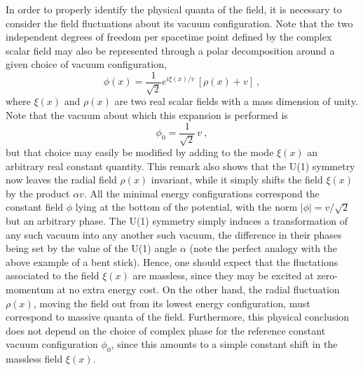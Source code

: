\documentclass[a4paper,11pt]{article}
\begin{document}
In order to properly identify the physical quanta of the field, it is
necessary to consider the field fluctuations about its vacuum configuration.
Note that the two independent degrees of freedom per spacetime point
defined by the complex scalar field may also be represented through
a polar decomposition around a given choice of vacuum configuration,
\begin{equation}
\phi(x)=\frac{1}{\sqrt{2}}e^{i\xi(x)/v}\,
\left[\rho(x)+v\right]\ ,
\label{eq:fluct}
\end{equation}
where $\xi(x)$ and $\rho(x)$ are two real scalar fields with a mass dimension
of unity. Note that the vacuum about which this expansion is performed is
\begin{equation}
\phi_0=\frac{1}{\sqrt{2}}\,v\ ,
\end{equation}
but that choice may easily be modified by adding to the mode $\xi(x)$
an arbitrary real constant quantity. This remark also shows that
the U(1) symmetry now leaves the radial field $\rho(x)$ invariant,
while it simply shifts the field $\xi(x)$ by the product $\alpha v$.
All the minimal energy configurations correspond the constant field $\phi$ 
lying at the bottom of the potential, with the norm $|\phi|=v/\sqrt{2}$ but an
arbitrary phase. The U(1) symmetry simply induces a transformation of
any such vacuum into any another such vacuum, the difference in their phases
being set by the value of the U(1) angle $\alpha$ (note the perfect analogy
with the above example of a bent stick). Hence, one should expect that
the fluctations associated to the field $\xi(x)$ are massless, since they
may be excited at zero-momentum at no extra energy cost. On the other hand,
the radial fluctuation $\rho(x)$, moving the field out from its lowest
energy configuration, must correspond to massive quanta of the field.
Furthermore, this physical conclusion does not depend on the choice of
complex phase for the reference constant vacuum configuration $\phi_0$, since
this amounts to a simple constant shift in the massless field $\xi(x)$.
\end{document}
